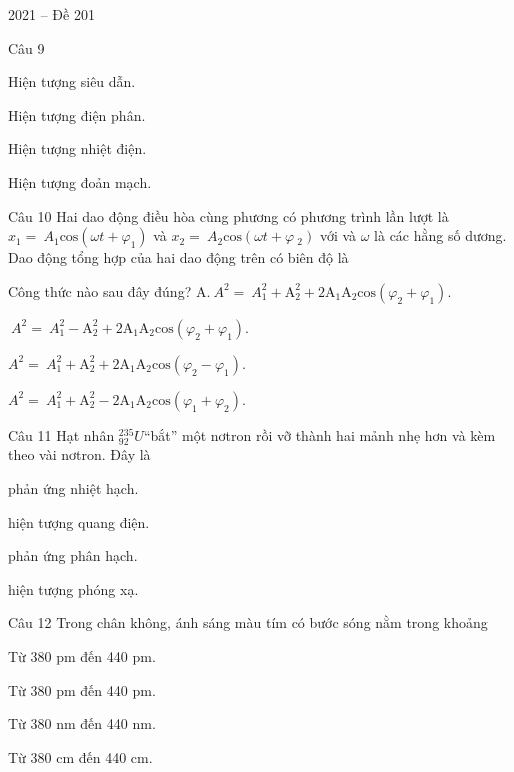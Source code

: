\documentclass{book}
\begin{document}
\begin{quiz}{2021 – Đề 201}
\begin{multi}[points=1]{Câu 9}
\item  Hiện tượng siêu dẫn.		
\item*  Hiện tượng điện phân.	
\item  Hiện tượng nhiệt điện.	
\item  Hiện tượng đoản mạch.
\end{multi}

\begin{multi}[points=1]{Câu 10}
 Hai dao động điều hòa cùng phương có phương trình lần lượt là ${{x}_{1}}=~{{A}_{1}}\text{cos}\left( \omega t+{{\varphi }_{1}} \right)$ và ${{x}_{2}}=~{{A}_{2}}\text{cos}\left( \omega t+\varphi {{~}_{2}} \right)$ với  và $\omega $ là các hằng số dương. Dao động tổng hợp của hai dao động trên có biên độ là 
\item  Công thức nào sau đây đúng?
A.$~{{A}^{2}}=~A_{1}^{2}+\text{A}_{2}^{2}+2{{\text{A}}_{1}}{{\text{A}}_{2}}\text{cos}\left( {{\varphi }_{2}}+{{\varphi }_{1}} \right)$.	
\item $~{{A}^{2}}=~A_{1}^{2}-\text{A}_{2}^{2}+2{{\text{A}}_{1}}{{\text{A}}_{2}}\text{cos}\left( {{\varphi }_{2}}+{{\varphi }_{1}} \right)$.	
\item*  ${{A}^{2}}=~A_{1}^{2}+\text{A}_{2}^{2}+2{{\text{A}}_{1}}{{\text{A}}_{2}}\text{cos}\left( {{\varphi }_{2}}-{{\varphi }_{1}} \right)$.	
\item  ${{A}^{2}}=~A_{1}^{2}+\text{A}_{2}^{2}-2{{\text{A}}_{1}}{{\text{A}}_{2}}\text{cos}\left( {{\varphi }_{1}}+{{\varphi }_{2}} \right)$.
\end{multi}

\begin{multi}[points=1]{Câu 11}
 Hạt nhân ${}_{92}^{235}U$“bắt” một nơtron rồi vỡ thành hai mảnh nhẹ hơn và kèm theo vài nơtron. Đây là

\item  phản ứng nhiệt hạch.	
\item  hiện tượng quang điện.	
\item*  phản ứng phân hạch.		
\item  hiện tượng phóng xạ.
\end{multi}

\begin{multi}[points=1]{Câu 12}
 Trong chân không, ánh sáng màu tím có bước sóng nằm trong khoảng

\item  Từ 380 pm đến 440 pm.	
\item  Từ 380 pm đến 440 pm.	
\item*  Từ 380 nm đến 440 nm.	
\item  Từ 380 cm đến 440 cm.
\end{multi}


\end{quiz}
\end{document}

